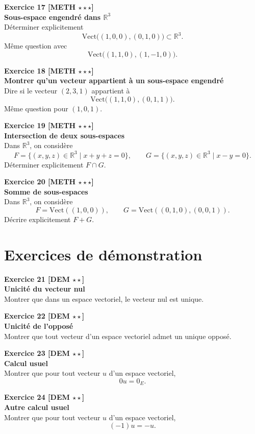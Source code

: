 \documentclass[11pt,a4paper]{article}
\begin{document}
\textbf{Exercice 17 [METH $\star\star\star$]}\\
\textbf{Sous-espace engendré dans $\mathbb{R}^3$}\\
Déterminer explicitement
\[
\mathrm{Vect}\big((1,0,0),(0,1,0)\big)\subset\mathbb{R}^3.
\]
Même question avec
\[
\mathrm{Vect}\big((1,1,0),(1,-1,0)\big).
\]

\textbf{Exercice 18 [METH $\star\star\star$]}\\
\textbf{Montrer qu’un vecteur appartient à un sous-espace engendré}\\
Dire si le vecteur $(2,3,1)$ appartient à
\[
\mathrm{Vect}\big((1,1,0),(0,1,1)\big).
\]
Même question pour $(1,0,1)$.

\textbf{Exercice 19 [METH $\star\star\star$]}\\
\textbf{Intersection de deux sous-espaces}\\
Dans $\mathbb{R}^3$, on considère
\[
F=\{(x,y,z)\in\mathbb{R}^3\mid x+y+z=0\},
\qquad
G=\{(x,y,z)\in\mathbb{R}^3\mid x-y=0\}.
\]
Déterminer explicitement $F\cap G$.

\textbf{Exercice 20 [METH $\star\star\star$]}\\
\textbf{Somme de sous-espaces}\\
Dans $\mathbb{R}^3$, on considère
\[
F=\mathrm{Vect}((1,0,0)),\qquad G=\mathrm{Vect}((0,1,0),(0,0,1)).
\]
Décrire explicitement $F+G$.

\newpage

\section*{Exercices de démonstration}

\textbf{Exercice 21 [DEM $\star\star$]}\\
\textbf{Unicité du vecteur nul}\\
Montrer que dans un espace vectoriel, le vecteur nul est unique.

\textbf{Exercice 22 [DEM $\star\star$]}\\
\textbf{Unicité de l’opposé}\\
Montrer que tout vecteur d’un espace vectoriel admet un unique opposé.

\textbf{Exercice 23 [DEM $\star\star$]}\\
\textbf{Calcul usuel}\\
Montrer que pour tout vecteur $u$ d’un espace vectoriel,
\[
0u=0_E.
\]

\textbf{Exercice 24 [DEM $\star\star$]}\\
\textbf{Autre calcul usuel}\\
Montrer que pour tout vecteur $u$ d’un espace vectoriel,
\[
(-1)u=-u.
\]
\end{document}
